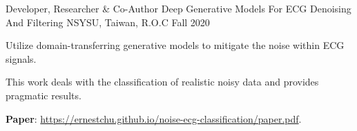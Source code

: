 \begin{cventries}
  \cventry
    {Developer, Researcher \& Co-Author} %
    {Deep Generative Models For ECG Denoising And Filtering} %
    {NSYSU, Taiwan, R.O.C} %
    {Fall 2020} %
    {
      \begin{cvitems} %
        \item {Utilize domain-transferring generative models to mitigate the noise within ECG signals.}
        \item {This work deals with the classification of realistic noisy data and provides pragmatic results.}
        \item {\textbf{Paper}: \href{https://ernestchu.github.io/noise-ecg-classification/paper.pdf}{https://ernestchu.github.io/noise-ecg-classification/paper.pdf}.}
      \end{cvitems}
    }

\end{cventries}

